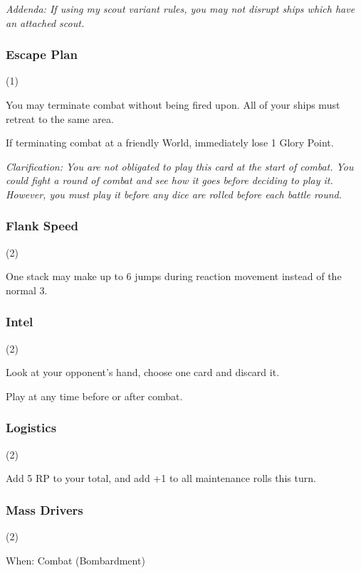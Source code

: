 \documentclass[a4paper,11pt,twocolumn]{article}
\begin{document}
\textit{Addenda: If using my scout variant rules, you may not disrupt ships which have an attached scout.}

\subsubsection{Escape Plan} (1)


You may terminate combat without being fired upon. All of your ships must retreat to the same area.

If terminating combat at a friendly World, immediately lose 1 Glory Point.

\textit{Clarification: You are not obligated to play this card at the start of combat. You could fight a round of combat and see how it goes before deciding to play it. However, you must play it before any dice are rolled before each battle round.}

\subsubsection{Flank Speed} (2)


One stack may make up to 6 jumps during reaction movement instead of the normal 3.

\subsubsection{Intel} (2)


Look at your opponent's hand, choose one card and discard it.

Play at any time before or after combat.

\subsubsection{Logistics} (2)


Add 5 RP to your total, and add +1 to all maintenance rolls this turn.

\subsubsection{Mass Drivers} (2)

When:  Combat (Bombardment)
\end{document}
